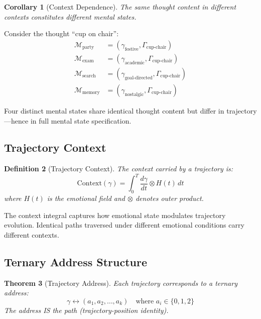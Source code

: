 \documentclass[twocolumn,amsmath,amssymb,aps,prl,superscriptaddress]{revtex4-2}
\newtheorem{theorem}{Theorem}[section]
\newtheorem{corollary}[theorem]{Corollary}
\newtheorem{definition}[theorem]{Definition}
\newcommand{\Mstate}{\mathcal{M}}
\newcommand{\Hfield}{H}
\newcommand{\Gstate}{\Gamma}
\newcommand{\traj}{\gamma}
\begin{document}
\begin{corollary}[Context Dependence]
The same thought content in different contexts constitutes different mental states.
\end{corollary}

Consider the thought ``cup on chair'':
\begin{align}
\Mstate_{\text{party}} &= (\traj_{\text{festive}}, \Gstate_{\text{cup-chair}}) \\
\Mstate_{\text{exam}} &= (\traj_{\text{academic}}, \Gstate_{\text{cup-chair}}) \\
\Mstate_{\text{search}} &= (\traj_{\text{goal-directed}}, \Gstate_{\text{cup-chair}}) \\
\Mstate_{\text{memory}} &= (\traj_{\text{nostalgic}}, \Gstate_{\text{cup-chair}})
\end{align}

Four distinct mental states share identical thought content but differ in trajectory---hence in full mental state specification.

\subsection{Trajectory Context}

\begin{definition}[Trajectory Context]
The context carried by a trajectory is:
\begin{equation}
\text{Context}(\traj) = \int_0^T \frac{d\traj}{dt} \otimes \Hfield(t) \, dt
\end{equation}
where $\Hfield(t)$ is the emotional field and $\otimes$ denotes outer product.
\end{definition}

The context integral captures how emotional state modulates trajectory evolution. Identical paths traversed under different emotional conditions carry different contexts.

\subsection{Ternary Address Structure}

\begin{theorem}[Trajectory Address]
\label{thm:address}
Each trajectory corresponds to a ternary address:
\begin{equation}
\traj \leftrightarrow (a_1, a_2, \ldots, a_k) \quad \text{where } a_i \in \{0, 1, 2\}
\end{equation}
The address IS the path (trajectory-position identity).
\end{theorem}
\end{document}
